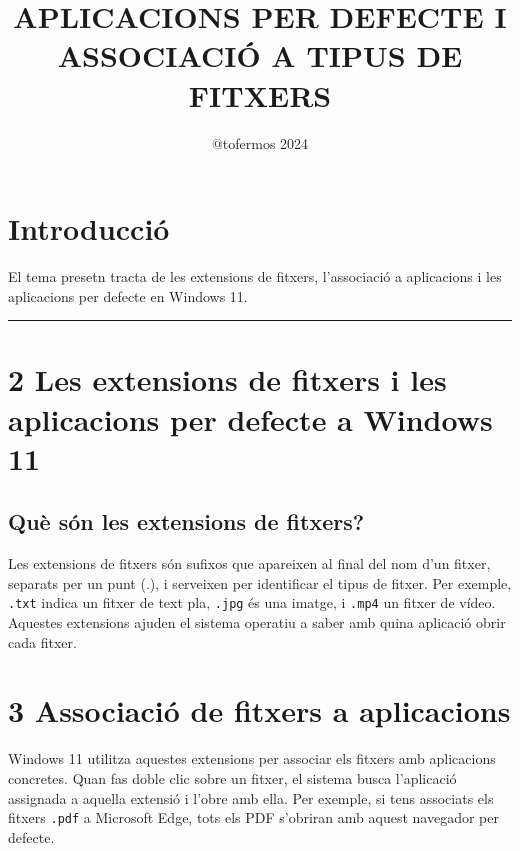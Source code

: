 \documentclass[
  a4paper,
]{article}
\title{APLICACIONS PER DEFECTE I ASSOCIACIÓ A TIPUS DE FITXERS}
\author{@tofermos 2024}
\date{}
\begin{document}
\maketitle

{
\setcounter{tocdepth}{2}
\tableofcontents
}
\newpage

\renewcommand\tablename{Tabla}

\section{Introducció}\label{introducciuxf3}

El tema presetn tracta de les extensions de fitxers, l'associació a
aplicacions i les aplicacions per defecte en Windows 11.

\begin{center}\rule{0.5\linewidth}{0.5pt}\end{center}

\section{2 Les extensions de fitxers i les aplicacions per defecte a
Windows
11}\label{les-extensions-de-fitxers-i-les-aplicacions-per-defecte-a-windows-11}

\subsection{Què són les extensions de
fitxers?}\label{quuxe8-suxf3n-les-extensions-de-fitxers}

Les extensions de fitxers són sufixos que apareixen al final del nom
d'un fitxer, separats per un punt (.), i serveixen per identificar el
tipus de fitxer. Per exemple, \texttt{.txt} indica un fitxer de text
pla, \texttt{.jpg} és una imatge, i \texttt{.mp4} un fitxer de vídeo.
Aquestes extensions ajuden el sistema operatiu a saber amb quina
aplicació obrir cada fitxer.

\section{3 Associació de fitxers a
aplicacions}\label{associaciuxf3-de-fitxers-a-aplicacions}

Windows 11 utilitza aquestes extensions per associar els fitxers amb
aplicacions concretes. Quan fas doble clic sobre un fitxer, el sistema
busca l'aplicació assignada a aquella extensió i l'obre amb ella. Per
exemple, si tens associats els fitxers \texttt{.pdf} a Microsoft Edge,
tots els PDF s'obriran amb aquest navegador per defecte.
\end{document}
